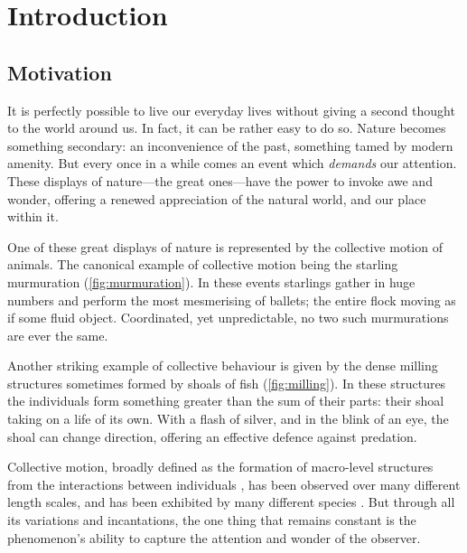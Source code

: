 \graphicspath{{fig/introduction/}}

\chapter{Introduction}
\label{cha:introduction}

\section{Motivation}
\label{sec:motivation}

It is perfectly possible to live our everyday lives without giving a second
thought to the world around us. In fact, it can be rather easy to do so. Nature
becomes something secondary: an inconvenience of the past, something tamed by
modern amenity. But every once in a while comes an event which \emph{demands}
our attention. These displays of nature---the great ones---have the power to
invoke awe and wonder, offering a renewed appreciation of the natural world,
and our place within it.

One of these great displays of nature is represented by the collective motion
of animals. The canonical example of collective motion being the starling
murmuration (\cref{fig:murmuration}). In these events starlings gather 
in huge numbers and perform the most mesmerising of ballets; the entire flock
moving as if some fluid object. Coordinated, yet unpredictable, no two such
murmurations are ever the same. 

Another striking example of collective behaviour is given by the dense milling
structures sometimes formed by shoals of fish (\cref{fig:milling}). In these
structures the individuals form something greater than the sum of their parts:
their shoal taking on a life of its own. With a flash of silver, and in the
blink of an eye, the shoal can change direction, offering an effective defence
against predation.

Collective motion, broadly defined as the formation of macro-level structures
from the interactions between individuals \parencite{camazine03}, has been
observed over many different length scales, and has been exhibited by many
different species \parencite{allee31}. But through all its variations and
incantations, the one thing that remains constant is the phenomenon's ability
to capture the attention and wonder of the observer.

